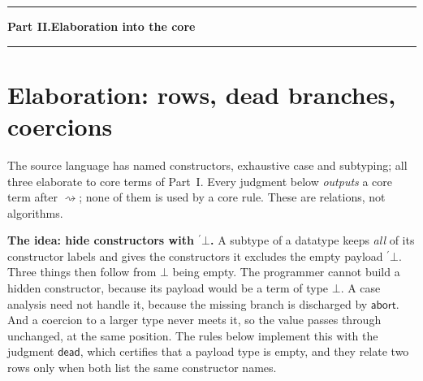\documentclass[10pt,a4paper]{article}
\newcommand{\op}[1]{\mathsf{#1}}
\newcommand{\code}[1]{{}^{\prime}\!#1}
\newcommand{\abort}{\op{abort}}
\newcommand{\Part}[2]{\par\bigskip\hrule\smallskip
 {\Large\bfseries Part #1.\quad #2}\par\smallskip\hrule\medskip}
\begin{document}
\newpage
\Part{II}{Elaboration into the core}
\section{Elaboration: rows, dead branches, coercions}\label{sec:elab}
The source language has named constructors, exhaustive case and subtyping;
all three elaborate to core terms of Part~I. Every judgment below
\emph{outputs} a core term after $\rightsquigarrow$; none of them is used by
a core rule. These are relations, not algorithms.

\textbf{The idea: hide constructors with $\code{\bot}$.} A subtype of a
datatype keeps \emph{all} of its constructor labels and gives the
constructors it excludes the empty payload $\code{\bot}$. Three things then
follow from $\bot$ being empty. The programmer cannot build a hidden
constructor, because its payload would be a term of type $\bot$. A case
analysis need not handle it, because the missing branch is discharged by
$\abort$. And a coercion to a larger type never meets it, so the value passes
through unchanged, at the same position. The rules below implement this with
the judgment $\op{dead}$, which certifies that a payload type is empty, and
they relate two rows only when both list the same constructor names.
\end{document}
